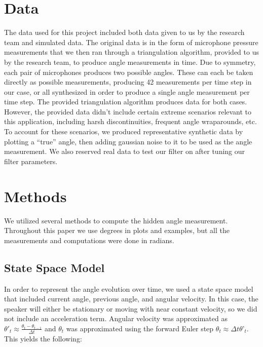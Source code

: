 \documentclass[11pt]{amsart}
\begin{document}
\section{Data}
The data used for this project included both data given to us by the research team and simulated data. The original data is in the form of microphone pressure measurements that we then ran through a triangulation algorithm, provided to us by the research team, to produce angle measurements in time. Due to symmetry, each pair of microphones produces two possible angles. These can each be taken directly as possible measurements, producing 42 measurements per time step in our case, or all synthesized in order to produce a single angle measurement per time step. The provided triangulation algorithm produces data for both cases.
However, the provided data didn’t include certain extreme scenarios relevant to this application, including harsh discontinuities, frequent angle wraparounds, etc. To account for these scenarios, we produced representative synthetic data by plotting a “true” angle, then adding gaussian noise to it to be used as the angle measurement. We also reserved real data to test our filter on after tuning our filter parameters.

\section{Methods}
We utilized several methods to compute the hidden angle measurement. Throughout this paper we use degrees in plots and examples, but all the measurements and computations were done in radians. 

\subsection{State Space Model}
In order to represent the angle evolution over time, we used a state space model that included current angle, previous angle, and angular velocity. In this case, the speaker will either be stationary or moving with near constant velocity, so we did not include an acceleration term. Angular velocity was approximated as $\theta'_t \approx \frac{\theta_{t} - \theta_{t-1}}{\Delta t}$ and $\theta_t$ was approximated using the forward Euler step $\theta_t \approx \Delta t\theta’_{t}$. This yields the following:
\end{document}

